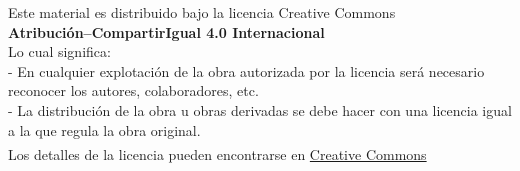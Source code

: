 \documentclass[a4paper,12pt,twoside,spanish,reqno,dottedtoc]{scrbook}
\begin{document}
    ${}^{}$\\
    {\flushleft 
        Este material es distribuido bajo la licencia Creative Commons} \\
        \center      \textbf{Atribución--CompartirIgual 4.0 Internacional}
    \\ 
    \center  Lo cual significa: 
    \\
    \flushleft
    - En cualquier explotación de la obra autorizada por la licencia será necesario reconocer los autores, colaboradores, etc.\\
    - La distribución de la obra u obras derivadas se debe hacer con una licencia igual a la que regula la obra original.\\
    ${}^{}$
    \\
    Los detalles de la licencia pueden encontrarse en \href{https://creativecommons.org/licenses/by/4.0/deed.es}{Creative Commons}
    \vskip 1cm 
    \endgroup

    
    
     
    \pagestyle{scrheadings} %
    \cleardoublepage %
    \cleardoublepage
    



    
    \setcounter{chapter}{0}
    \cleardoublepage
        
       
     
\end{document}
